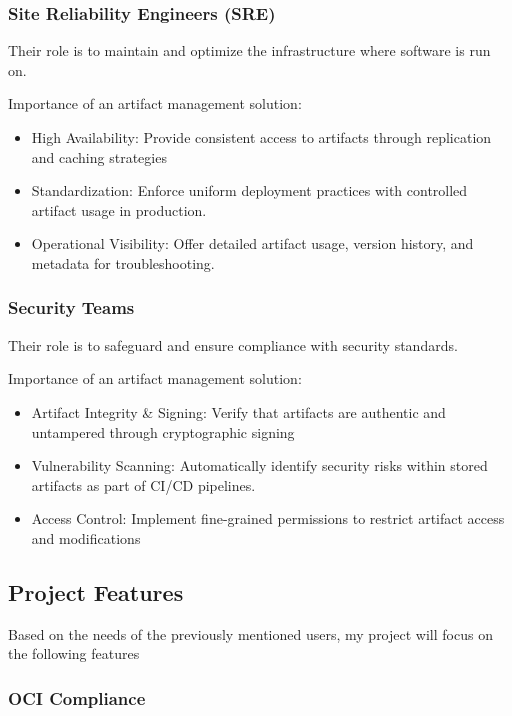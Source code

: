 \documentclass{article}
\begin{document}
  \subsubsection{Site Reliability Engineers (SRE)}

  Their role is to maintain and optimize the infrastructure where software is run on.

  Importance of an artifact management solution:
  \begin{itemize}
    \item High Availability: Provide consistent access to artifacts through replication and caching strategies
    \item Standardization: Enforce uniform deployment practices with controlled artifact usage in production.
    \item Operational Visibility: Offer detailed artifact usage, version history, and metadata for troubleshooting.
  \end{itemize}

  \subsubsection{Security Teams}

  Their role is to safeguard and ensure compliance with security standards.

  Importance of an artifact management solution:
  \begin{itemize}
    \item Artifact Integrity \& Signing: Verify that artifacts are authentic and untampered through cryptographic signing
    \item Vulnerability Scanning: Automatically identify security risks within stored artifacts as part of CI/CD pipelines.
    \item Access Control: Implement fine-grained permissions to restrict artifact access and modifications
  \end{itemize}

  \subsection{Project Features}

  Based on the needs of the previously mentioned users, my project will focus on the following features

  \subsubsection{OCI Compliance}
\end{document}
